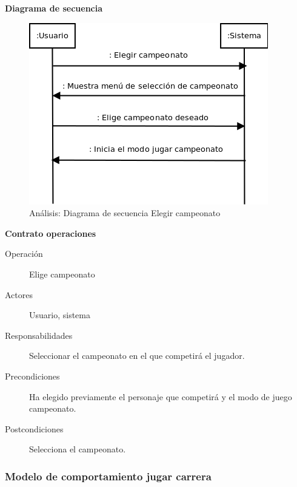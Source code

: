 \textbf{Diagrama de secuencia}
\begin{figure}[H]
  \label{dia_elegir_campeonato}
  \begin{center}
    \includegraphics[scale=0.5]{imagenes/dia_elegir_campeonato.png}
  \end{center}
  \caption{Análisis: Diagrama de secuencia Elegir campeonato}
\end{figure}

\textbf{Contrato operaciones}

\begin{description}
    \item[Operación] Elige campeonato
    \item[Actores] Usuario, sistema
    \item[Responsabilidades] Seleccionar el campeonato en el que competirá el jugador.
    \item[Precondiciones] Ha elegido previamente el personaje que competirá y el modo de juego campeonato.
    \item[Postcondiciones] Selecciona el campeonato.
\end{description}

\subsubsection{Modelo de comportamiento jugar carrera}

